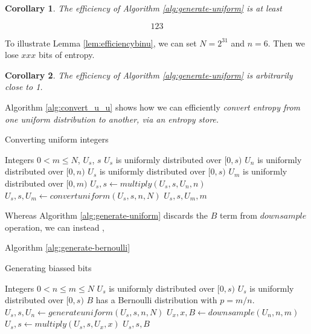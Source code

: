 \documentclass[12pt]{article}
\newtheorem{corollary}{Corollary}
\begin{document}
\begin{corollary}
The efficiency of Algorithm \ref{alg:generate-uniform} is at least

\begin{equation}
123
\end{equation}
\end{corollary}

To illustrate Lemma \ref{lem:efficiencybinu}, we can set $N=2^{31}$ and $n=6$. Then we lose $xxx$ bits of entropy.

\begin{corollary}
The efficiency of Algorithm \ref{alg:generate-uniform} is arbitrarily close to 1.
\end{corollary}

Algorithm \ref{alg:convert_u_u} shows how we can efficiently \em convert \em entropy from one uniform distribution to another, via an entropy store.

\begin{algorithm}
\caption{Converting uniform integers}
\label{alg:convert_u_u}
\begin{algorithmic}[1]
    \Require Integers $0 < m \le N$, $U_s$, $s$
    \Require $U_s$ is uniformly distributed over $[0,s)$
    \Require $U_n$ is uniformly distributed over $[0,n)$
    \Ensure  $U_s$ is uniformly distributed over $[0,s)$
    \Ensure  $U_m$ is uniformly distributed over $[0,m)$
    \State $U_s, s \gets multiply(U_s, s, U_n, n)$
    \State $U_s, s, U_m \gets convertuniform(U_s, s, n, N)$
    \State \Return $U_s, s, U_m, m$
\EndProcedure
\end{algorithmic}
\end{algorithm}



Whereas Algorithm \ref{alg:generate-uniform} discards the $B$ term from $downsample$ operation, we can instead , 

Algorithm \ref{alg:generate-bernoulli}

\begin{algorithm}
\caption{Generating biassed bits}
\label{alg:generate-bernoulli}
\begin{algorithmic}[1]
\Require Integers $0 < n \le m \le N$
\Require $U_s$ is uniformly distributed over $[0,s)$
\Ensure $U_s$ is uniformly distributed over $[0,s)$
\Ensure $B$ has a Bernoulli distribution with $p = m/n$.
    \State $U_s, s, U_n \gets generateuniform(U_s, s, n, N)$
    \State $U_x, x, B \gets downsample(U_n, n, m)$
    \State $U_s, s \gets multiply(U_s, s, U_x, x)$
    \State \Return $U_s, s, B$
\EndProcedure
\end{algorithmic}
\end{algorithm}
\end{document}

